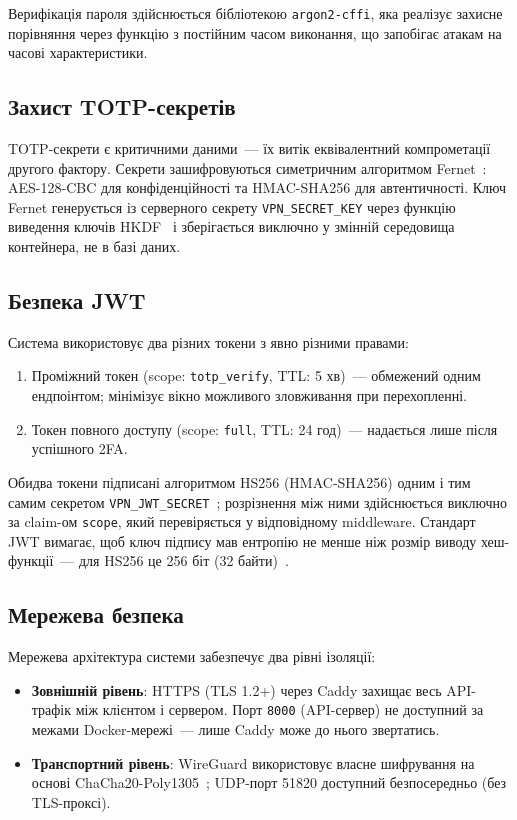 Верифікація пароля здійснюється бібліотекою \texttt{argon2-cffi},
яка реалізує захисне порівняння через функцію з постійним часом
виконання, що запобігає атакам на часові характеристики.

\subsection{Захист TOTP-секретів}

TOTP-секрети є критичними даними~--- їх витік еквівалентний
компрометації другого фактору. Секрети зашифровуються симетричним
алгоритмом Fernet~\cite{cryptography_fernet}: AES-128-CBC для
конфіденційності та HMAC-SHA256 для автентичності. Ключ Fernet
генерується із серверного секрету \texttt{VPN\_SECRET\_KEY}
через функцію виведення ключів HKDF~\cite{rfc5869} і зберігається
виключно у змінній середовища контейнера, не в базі даних.

\subsection{Безпека JWT}

Система використовує два різних токени з явно різними правами:

\begin{enumerate}
  \item Проміжний токен (scope: \texttt{totp\_verify}, TTL: 5 хв)~---
    обмежений одним ендпоінтом; мінімізує вікно можливого зловживання
    при перехопленні.

  \item Токен повного доступу (scope: \texttt{full}, TTL: 24 год)~---
    надається лише після успішного 2FA.
\end{enumerate}

Обидва токени підписані алгоритмом HS256 (HMAC-SHA256) одним і тим самим
секретом \texttt{VPN\_JWT\_SECRET}~\cite{rfc7519}; розрізнення між ними
здійснюється виключно за claim-ом \texttt{scope}, який перевіряється у
відповідному middleware.
Стандарт JWT вимагає, щоб ключ підпису мав ентропію не менше ніж
розмір виводу хеш-функції~--- для HS256 це 256 біт (32 байти)~\cite{rfc7518}.

\subsection{Мережева безпека}

Мережева архітектура системи забезпечує два рівні ізоляції:

\begin{itemize}
  \item \textbf{Зовнішній рівень}: HTTPS (TLS 1.2+) через Caddy
    захищає весь API-трафік між клієнтом і сервером. Порт
    \texttt{8000} (API-сервер) не доступний за межами Docker-мережі~---
    лише Caddy може до нього звертатись.

  \item \textbf{Транспортний рівень}: WireGuard використовує власне
    шифрування на основі ChaCha20-Poly1305~\cite{donenfeld2017wireguard};
    UDP-порт 51820 доступний безпосередньо (без TLS-проксі).
\end{itemize}

